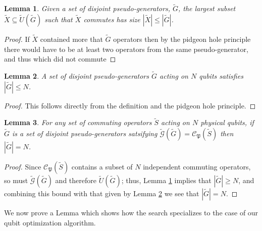 \documentclass[twocolumn,showpacs,preprintnumbers,amsmath,amssymb,nofootinbib,pra,floatfix]{revtex4-1}
\newtheorem{lemma}{Lemma}
\newenvironment{remark}[1][Remark]{\begin{trivlist}
\item[\hskip \labelsep {\bfseries #1}]}{\end{trivlist}}
\newcommand{\set}{\tilde}
\newcommand{\genfun}{\tilde{\mathcal{G}}}
\newcommand{\pauligroup}{\mathfrak{P}}
\newcommand{\centralizer}{\mathcal{C}}
\begin{document}
\begin{lemma}
\label{lemma:lower bound on number of disjoint pseudo-generators}
Given a set of disjoint pseudo-generators, $\set G$, the largest subset $\set X\subseteq\set U(\set G)$ such that $\set X$ commutes has size $|\set X|\le|\set G|$.
\end{lemma}

\begin{proof}
If $\set X$ contained more that $\set G$ operators then by the pidgeon hole principle there would have to be at least two operators from the same pseudo-generator, and thus which did not commute
\end{proof}

\begin{lemma}
\label{lemma:upper bound on number of disjoint pseudo-generators}
A set of disjoint pseudo-generators $\set G$ acting on $N$ qubits satisfies $|\set G|\le N$.
\end{lemma}

\begin{proof}
This follows directly from the definition and the pidgeon hole principle.
\end{proof}

\begin{lemma}
\label{lemma:exact bound on number of disjoint pseudo-generators}
For any set of commuting operators $\set S$ acting on $N$ physical qubits, if $\set G$ is a set of disjoint pseudo-generators satsifying $\genfun(\set G)=\centralizer_\pauligroup(\set S)$ then $|\set G|= N$.
\end{lemma}

\begin{proof}
Since $\centralizer_\pauligroup(\set S)$ contains a subset of $N$ independent commuting operators, so must $\genfun(\set G)$ and therefore $\set U(\set G)$;  thus, Lemma \ref{lemma:lower bound on number of disjoint pseudo-generators} implies that $|\set G|\ge N$, and combining this bound with that given by Lemma \ref{lemma:upper bound on number of disjoint pseudo-generators} we see that $|\set G|=N$.
\end{proof}
\begin{remark}
We now prove a Lemma which shows how the search specializes to the case of our qubit optimization algorithm.
\end{remark}
\end{document}
